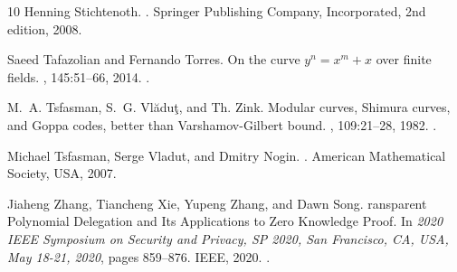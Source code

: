 \begin{thebibliography}{10}
{Henning} Stichtenoth.
.
\newblock Springer Publishing Company, Incorporated, 2nd edition, 2008.

Saeed {Tafazolian} and Fernando {Torres}.
\newblock On the curve $y^n = x^m + x$ over finite fields.
, 145:51--66, 2014.
\newblock \href {https://doi.org/10.1016/j.jnt.2014.05.019}
  {}.

M.~A. Tsfasman, S.~G. Vl\u{a}du\c{t}, and Th. Zink.
\newblock Modular curves, {S}himura curves, and {G}oppa codes, better than
  {V}arshamov-{G}ilbert bound.
, 109:21--28, 1982.
\newblock \href {https://doi.org/10.1002/mana.19821090103}
  {}.

Michael Tsfasman, Serge Vladut, and Dmitry Nogin.
.
\newblock American Mathematical Society, USA, 2007.

Jiaheng {Zhang}, Tiancheng {Xie}, Yupeng {Zhang}, and Dawn {Song}.
ransparent {P}olynomial {D}elegation and {I}ts {A}pplications to
  {Z}ero {K}nowledge {P}roof.
\newblock In {\em 2020 {IEEE} Symposium on Security and Privacy, {SP} 2020, San
  Francisco, CA, USA, May 18-21, 2020}, pages 859--876. {IEEE}, 2020.
\newblock \href {https://doi.org/10.1109/SP40000.2020.00052}
  {}.

\end{thebibliography}

